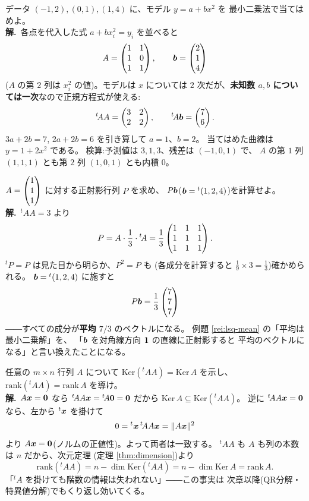 \begin{rei}[例題・標準(放物線の当てはめ)]\label{rei:lsq-parabola}
データ $(-1, 2), (0, 1), (1, 4)$ に、モデル $y = a + bx^2$ を
最小二乗法で当てはめよ。\\
\textbf{解.}\ 各点を代入した式 $a + b x_i^2 = y_i$ を並べると
\[
A = \begin{pmatrix}1 & 1 \\ 1 & 0 \\ 1 & 1\end{pmatrix}, \qquad \bm{b} = \begin{pmatrix}2 \\ 1 \\ 4\end{pmatrix}
\]
($A$ の第 $2$ 列は $x_i^2$ の値)。モデルは $x$ については
$2$ 次だが、\textbf{未知数 $a, b$ については一次}なので正規方程式が使える:
\[
{}^t\!AA = \begin{pmatrix}3 & 2 \\ 2 & 2\end{pmatrix}, \qquad {}^t\!A\bm{b} = \begin{pmatrix}7 \\ 6\end{pmatrix}.
\]
$3a + 2b = 7$, $2a + 2b = 6$ を引き算して $a = 1$、$b = 2$。
当てはめた曲線は $y = 1 + 2x^2$ である。
検算:予測値は $3, 1, 3$、残差は $(-1, 0, 1)$ で、
$A$ の第 $1$ 列 $(1,1,1)$ とも第 $2$ 列 $(1,0,1)$ とも内積 $0$。
\end{rei}

\begin{rei}[例題・標準(正射影行列)]\label{rei:lsq-projmat-ex}
$A = \begin{pmatrix}1 \\ 1 \\ 1\end{pmatrix}$ に対する正射影行列 $P$ を求め、
$P\bm{b}$($\bm{b} = {}^t(1, 2, 4)$)を計算せよ。\\
\textbf{解.}\ ${}^t\!AA = 3$ より
\[
P = A \cdot \frac{1}{3} \cdot {}^t\!A
= \frac{1}{3}\begin{pmatrix}1 & 1 & 1 \\ 1 & 1 & 1 \\ 1 & 1 & 1\end{pmatrix}.
\]
${}^t\!P = P$ は見た目から明らか、$P^2 = P$ も
(各成分を計算すると $\frac{1}{9} \times 3 = \frac{1}{3}$)確かめられる。
$\bm{b} = {}^t(1, 2, 4)$ に施すと
\[
P\bm{b} = \frac{1}{3}\begin{pmatrix}7 \\ 7 \\ 7\end{pmatrix}
\]
――すべての成分が\textbf{平均 $7/3$} のベクトルになる。
例題 \ref{rei:lsq-mean} の「平均は最小二乗解」を、
「$\bm{b}$ を対角線方向 $\bm{1}$ の直線に正射影すると
平均のベクトルになる」と言い換えたことになる。
\end{rei}

\begin{rei}[例題・標準(証明:${}^t\!AA$ と $A$ の核は一致する)]\label{rei:lsq-kernel}
任意の $m \times n$ 行列 $A$ について
$\mathrm{Ker}({}^t\!AA) = \mathrm{Ker}\,A$ を示し、
$\mathrm{rank}({}^t\!AA) = \mathrm{rank}\,A$ を導け。\\
\textbf{解.}\ $A\bm{x} = \bm{0}$ なら
${}^t\!AA\bm{x} = {}^t\!A\bm{0} = \bm{0}$ だから
$\mathrm{Ker}\,A \subseteq \mathrm{Ker}({}^t\!AA)$。
逆に ${}^t\!AA\bm{x} = \bm{0}$ なら、左から ${}^t\bm{x}$ を掛けて
\[
0 = {}^t\bm{x}\,{}^t\!AA\bm{x} = \|A\bm{x}\|^2
\]
より $A\bm{x} = \bm{0}$(ノルムの正値性)。よって両者は一致する。
${}^t\!AA$ も $A$ も列の本数は $n$ だから、次元定理
(定理 \ref{thm:dimension})より
\[
\mathrm{rank}({}^t\!AA) = n - \dim\mathrm{Ker}({}^t\!AA)
= n - \dim\mathrm{Ker}\,A = \mathrm{rank}\,A.
\]
「${}^t\!A$ を掛けても階数の情報は失われない」――この事実は
次章以降(QR分解・特異値分解)でもくり返し効いてくる。
\end{rei}

